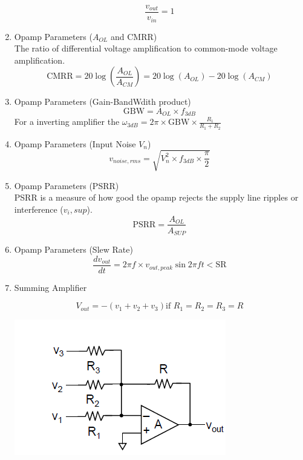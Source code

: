 \begin{enumerate}
    \begin{equation}
        \frac{v_{out}}{v_{in}} = 1
    \end{equation}
    \item Opamp Parameters ($A_{OL}$ and CMRR) \\
    The ratio of differential voltage amplification to common-mode voltage amplification.
    \begin{equation}
        \text{CMRR} = 20\log(\frac{A_{OL}}{A_{CM}}) = 20\log(A_{OL})-20\log(A_{CM})
    \end{equation}
    \item Opamp Parameters (Gain-BandWdith product) 
    \begin{equation}
        \text{GBW} = A_{OL} \times f_{3dB}
    \end{equation}
    For a inverting amplifier the $\omega_{3dB} = 2\pi \times \text{GBW} \times \frac{R_1}{R_1+R_2}$
    \item Opamp Parameters (Input Noise $V_n$) 
    \begin{equation}
        v_{noise,rms} = \sqrt{V_n^2\times f_{3dB}\times\frac{\pi}{2}}
    \end{equation}
    \item Opamp Parameters (PSRR) \\
    PSRR is a measure of how good the opamp rejects the supply line ripples or interference ($v_i,sup$).
    \begin{equation}
        \text{PSRR} = \frac{A_{OL}}{A_{SUP}}
    \end{equation}
    \item Opamp Parameters (Slew Rate) 
    \begin{equation}
        \frac{dv_{out}}{dt} = 2\pi f \times v_{out,peak}\sin{2\pi ft} < \text{SR}
    \end{equation}
    \item Summing Amplifier \\
    \begin{minipage}{0.5\textwidth}
        \begin{equation}
        V_{out} = -(v_1+v_2+v_3) \text{if $R_1=R_2=R_3=R$}
    \end{equation}
    \end{minipage}
    \begin{minipage}{0.5\textwidth}
        \includegraphics[width=0.75\linewidth]{image/summingamp.png}

\end{minipage}
\end{enumerate}

